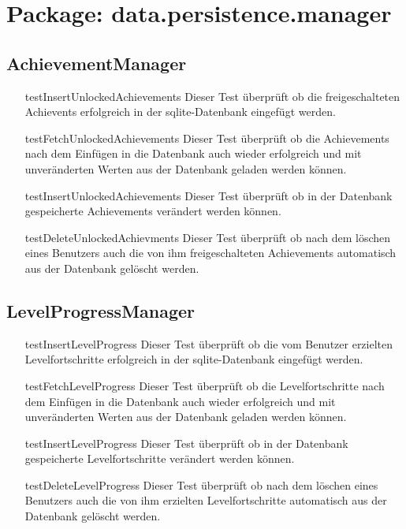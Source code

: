\section{Package: data.persistence.manager}

\subsection{AchievementManager}

\begin{itemize}

\item[testInsertUnlockedAchievements]
Dieser Test überprüft ob die freigeschalteten Achievents erfolgreich in der sqlite-Datenbank eingefügt werden. 

\item[testFetchUnlockedAchievements]
Dieser Test überprüft ob die Achievements nach dem Einfügen in die Datenbank auch wieder erfolgreich und mit unveränderten Werten aus der Datenbank geladen werden können.

\item[testInsertUnlockedAchievements]
Dieser Test überprüft ob in der Datenbank gespeicherte Achievements verändert werden können.

\item[testDeleteUnlockedAchievments]
Dieser Test überprüft ob nach dem löschen eines Benutzers auch die von ihm freigeschalteten Achievements automatisch aus der Datenbank gelöscht werden.

\end{itemize}

\subsection{LevelProgressManager}

\begin{itemize}

\item[testInsertLevelProgress]
Dieser Test überprüft ob die vom Benutzer erzielten Levelfortschritte erfolgreich in der sqlite-Datenbank eingefügt werden. 

\item[testFetchLevelProgress]
Dieser Test überprüft ob die Levelfortschritte nach dem Einfügen in die Datenbank auch wieder erfolgreich und mit unveränderten Werten aus der Datenbank geladen werden können.

\item[testInsertLevelProgress]
Dieser Test überprüft ob in der Datenbank gespeicherte Levelfortschritte verändert werden können.

\item[testDeleteLevelProgress]
Dieser Test überprüft ob nach dem löschen eines Benutzers auch die von ihm erzielten Levelfortschritte automatisch aus der Datenbank gelöscht werden.

\end{itemize}

